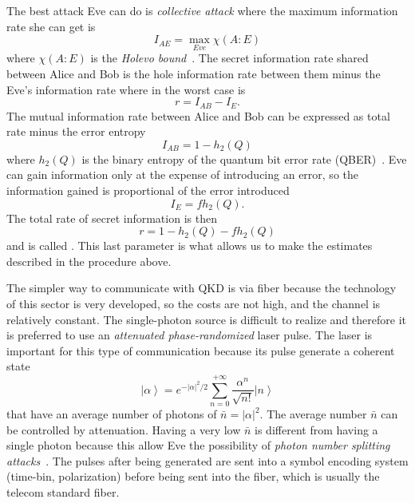 The best attack Eve can do is \textit{collective attack} where the maximum information rate she can get is
\begin{equation}
  I_{AE} = \max_{Eve} \chi(A:E)
\end{equation}
where $\chi(A:E)$ is the \textit{Holevo bound}~\cite{a24}. The secret information rate shared between Alice and Bob is the hole information rate between them minus the Eve's information rate where in the worst case is
\begin{equation}
  r = I_{AB} - I_{E}.
\end{equation}
The mutual information rate between Alice and Bob can be expressed as total rate minus the error entropy
\begin{equation}
  I_{AB} = 1 - h_2(Q)
\end{equation}
where $h_2(Q)$ is the binary entropy of the quantum bit error rate (QBER)~\cite{a24}. Eve can gain information only at the expense of introducing an error, so the information gained is proportional of the error introduced
\begin{equation}
  I_E = f h_2(Q).
\end{equation}
The total rate of secret information is then
\begin{equation}
  r = 1 - h_2(Q) - f h_2(Q)
\end{equation}
and is called . This last parameter is what allows us to make the estimates described in the procedure above.


The simpler way to communicate with QKD is via fiber because the technology of this sector is very developed, so the costs are not high, and the channel is relatively constant. The single-photon source is difficult to realize and therefore it is preferred to use an \textit{attenuated phase-randomized} laser pulse. The laser is important for this type of communication because its pulse generate a coherent state
\begin{equation}
  \left|\alpha\right> = e^{- |\alpha|^2 / 2} \sum_{n=0}^{+\infty} \frac{\alpha^n}{\sqrt{n!}} \left|n\right>
\end{equation}
that have an average number of photons of $\bar{n} = |\alpha|^2$. The average number $\bar{n}$ can be controlled by attenuation. Having a very low $\bar{n}$ is different from having a single photon because this allow Eve the possibility of \textit{photon number splitting attacks}~\cite{a24}. The pulses after being generated are sent into a symbol encoding system (time-bin, polarization) before being sent into the fiber, which is usually the telecom standard fiber.

